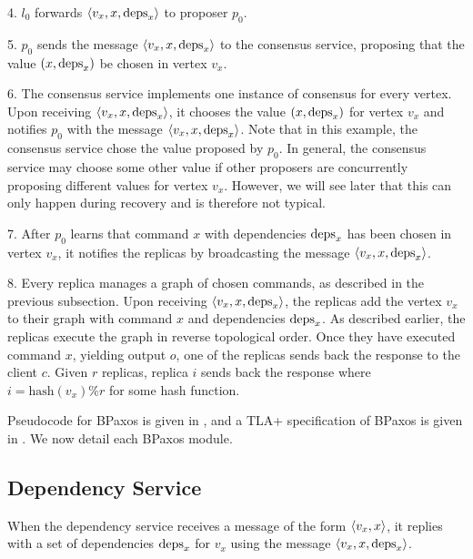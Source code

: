 4. $l_0$ forwards $\langle v_x, x, \text{deps}_x \rangle$ to proposer $p_0$.

5. $p_0$ sends the message $\langle v_x, x, \text{deps}_x \rangle$ to the consensus service,
proposing that the value $(x, \text{deps}_x)$ be chosen in vertex $v_x$.

6. The consensus service implements one instance of consensus for every vertex.
Upon receiving $\langle v_x, x, \text{deps}_x \rangle$, it chooses the value $(x, \text{deps}_x)$
for vertex $v_x$ and notifies $p_0$ with the message $\langle v_x, x, \text{deps}_x \rangle$.
Note that in this example, the consensus service chose the value proposed by
$p_0$. In general, the consensus service may choose some other value if other
proposers are concurrently proposing different values for vertex $v_x$.
However, we will see later that this can only happen during recovery and is
therefore not typical.

7. After $p_0$ learns that command $x$ with dependencies $\text{deps}_x$ has been
chosen in vertex $v_x$, it notifies the replicas by broadcasting the message
$\langle v_x, x, \text{deps}_x \rangle$.

8. Every replica manages a graph of chosen commands, as described in the
previous subsection. Upon receiving $\langle v_x, x, \text{deps}_x \rangle$, the replicas add
the vertex $v_x$ to their graph with command $x$ and dependencies $\text{deps}_x$.
As described earlier, the replicas execute the graph in reverse topological
order. Once they have executed command $x$, yielding output $o$, one of the
replicas sends back the response to the client $c$. Given $r$ replicas, replica
$i$ sends back the response where $i = \text{hash}(v_x) \% r$ for some hash
function.

Pseudocode for BPaxos is given in , and a TLA+
specification of BPaxos is given in . We now detail each BPaxos
module.

{}
{}

\subsection{Dependency Service}
When the dependency service receives a message of the form $\langle v_x, x \rangle$, it
replies with a set of dependencies $\text{deps}_x$ for $v_x$ using the message
$\langle v_x, x, \text{deps}_x \rangle$.

